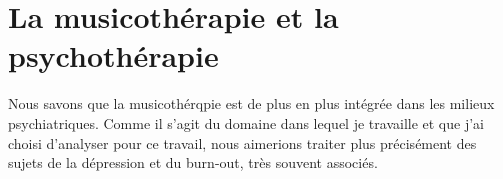 \chapter{La musicothérapie et la psychothérapie}

Nous savons que la musicothérqpie est de plus en plus intégrée dans
les milieux psychiatriques.  Comme il s'agit du domaine dans lequel je
travaille et que j'ai choisi d'analyser pour ce travail, nous
aimerions traiter plus précisément des sujets de la dépression et du
burn-out, très souvent associés.

